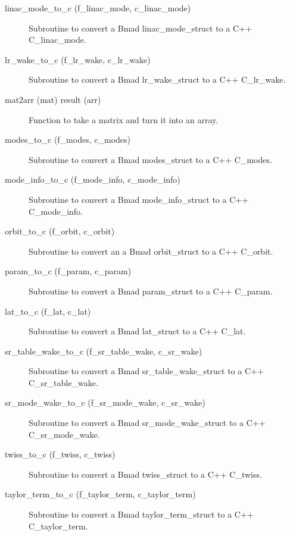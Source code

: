\begin{description}
\item[linac_mode_to_c (f_linac_mode, c_linac_mode)] \Newline 
Subroutine to convert a Bmad linac_mode_struct to a C++ C_linac_mode.

\item[lr_wake_to_c (f_lr_wake, c_lr_wake)] \Newline 
Subroutine to convert a Bmad lr_wake_struct to a C++ C_lr_wake.

\item[mat2arr (mat) result (arr)] \Newline 
Function to take a matrix and turn it into an array.

\item[modes_to_c (f_modes, c_modes)] \Newline 
Subroutine to convert a Bmad modes_struct to a C++ C_modes.

\item[mode_info_to_c (f_mode_info, c_mode_info)] \Newline 
Subroutine to convert a Bmad mode_info_struct to a C++ C_mode_info.

\item[orbit_to_c (f_orbit, c_orbit)] \Newline 
Subroutine to convert an a Bmad orbit_struct to a C++ C_orbit.

\item[param_to_c (f_param, c_param)] \Newline 
Subroutine to convert a Bmad param_struct to a C++ C_param.

\item[lat_to_c (f_lat, c_lat)] \Newline 
Subroutine to convert a Bmad lat_struct to a C++ C_lat.

\item[sr_table_wake_to_c (f_sr_table_wake, c_sr_wake)] \Newline 
Subroutine to convert a Bmad sr_table_wake_struct to a C++ C_sr_table_wake.

\item[sr_mode_wake_to_c (f_sr_mode_wake, c_sr_wake)] \Newline 
Subroutine to convert a Bmad sr_mode_wake_struct to a C++ C_sr_mode_wake.

\item[twiss_to_c (f_twiss, c_twiss)] \Newline 
Subroutine to convert a Bmad twiss_struct to a C++ C_twiss.

\item[taylor_term_to_c (f_taylor_term, c_taylor_term)] \Newline 
Subroutine to convert a Bmad taylor_term_struct to a C++ C_taylor_term.


\end{description}
